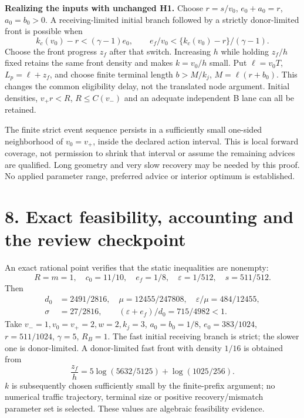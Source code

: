 \documentclass[11pt,a4paper]{article}
\begin{document}
\textbf{Realizing the inputs with unchanged H1.} Choose $r=s/v_0$,
$e_0+a_0=r$, $a_0=b_0>0$. A receiving-limited initial branch followed
by a strictly donor-limited front is possible when
\begin{equation}
 k_c(v_0)-r<(\gamma-1)e_0,
 \qquad e_f/v_0<\{k_c(v_0)-r\}/(\gamma-1). \tag{24}
\end{equation}
Choose the front progress $z_f$ after that switch. Increasing $h$ while
holding $z_f/h$ fixed retains the same front density and makes $k=v_0/h$
small. Put $\ell=v_0T$, $L_p=\ell+z_f$, and choose finite terminal
length $b>M/k_j$, $M=\ell(r+b_0)$. This changes the common eligibility
delay, not the translated node argument. Initial densities, $v_+r<R$,
$R\leq C(v_-)$ and an adequate independent B lane can all be retained.

The finite strict event sequence persists in a sufficiently small
one-sided neighborhood of $v_0=v_+$, inside the declared action interval.
This is local forward coverage, not permission to shrink that interval
or assume the remaining advices are qualified. Long geometry and very
slow recovery may be needed by this proof. No applied parameter range,
preferred advice or interior optimum is established.

\newpage
\section*{8. Exact feasibility, accounting and the review checkpoint}

An exact rational point verifies that the static inequalities are nonempty:
\begin{equation}
 R=m=1,\quad c_0=11/10,\quad e_f=1/8,\quad
 \varepsilon=1/512,\quad s=511/512. \tag{25}
\end{equation}
Then
\begin{align}
 d_0&=2491/2816,\quad \mu=12455/247808,\quad
 \varepsilon/\mu=484/12455,\nonumber\\
 \sigma&=27/2816,\qquad
 (\varepsilon+e_f)/d_0=715/4982<1. \tag{26}
\end{align}
Take $v_-=1,v_0=v_+=2,w=2,k_j=3$, $a_0=b_0=1/8$,
$e_0=383/1024$, $r=511/1024$, $\gamma=5$, $R_B=1$.
The fast initial receiving branch is strict; the slower one is donor-limited.
A donor-limited fast front with density $1/16$ is obtained from
\begin{equation}
 \frac{z_f}{h}=5\log(5632/5125)+\log(1025/256). \tag{27}
\end{equation}
$k$ is subsequently chosen sufficiently small by the finite-prefix argument;
no numerical traffic trajectory, terminal size or positive recovery/mismatch
parameter set is selected. These values are algebraic feasibility evidence.
\end{document}

